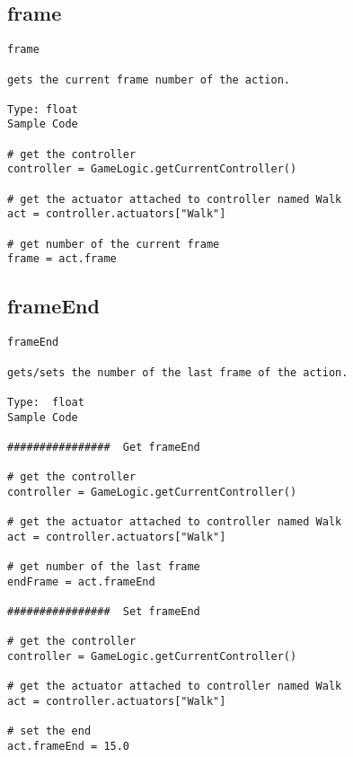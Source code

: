 \subsection{frame}
\begin{verbatim}
frame

gets the current frame number of the action.

Type: float 
Sample Code

# get the controller
controller = GameLogic.getCurrentController()

# get the actuator attached to controller named Walk
act = controller.actuators["Walk"]

# get number of the current frame
frame = act.frame
\end{verbatim}


\subsection{frameEnd}
\begin{verbatim}
frameEnd

gets/sets the number of the last frame of the action.

Type:  float 
Sample Code

################  Get frameEnd

# get the controller
controller = GameLogic.getCurrentController()

# get the actuator attached to controller named Walk
act = controller.actuators["Walk"]

# get number of the last frame
endFrame = act.frameEnd

################  Set frameEnd

# get the controller
controller = GameLogic.getCurrentController()

# get the actuator attached to controller named Walk
act = controller.actuators["Walk"]

# set the end
act.frameEnd = 15.0
\end{verbatim}


